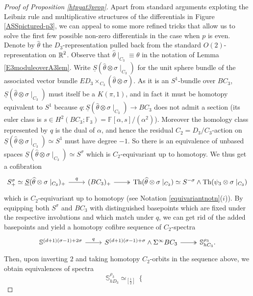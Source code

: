\documentclass[a4paper, oneside]{amsart}
\newcommand{\1}{\mathds{1}}
\theoremstyle{remark}
\theoremstyle{definition}
\newcommand{\R}{{\scaleobj{0.97}{\mathbb{R}}}}
\newcommand{\s}{\mathbb{S}}
\numberwithin{equation}{section}
\begin{document}
\begin{proof}[Proof of Proposition \ref{htpyat3prop}]
Apart from standard arguments exploting the Leibniz rule and multiplicative structures of the differentials in Figure \ref{ASSpictured-p3}, we can appeal to some more refined tricks that allow us to solve the first few possible non-zero differentials in the case when $p$ is even. Denote by $\widehat{\theta}$ the $D_3$-representation pulled back from the standard $O(2)$-representation on $\R^2$. Observe that $\widehat{\theta}\mid_{C_3}\equiv \theta$ in the notation of Lemma \ref{E3moduleoverA3lem}. Write $\underline{S}(\widehat{\theta}\otimes\sigma\mid_{C_3})$ for the unit sphere bundle of the associated vector bundle $ED_3\times_{C_3}(\widehat{\theta}\otimes\sigma)$. As it is an $S^1$-bundle over $BC_3$, $\underline{S}(\widehat\theta\otimes \sigma\mid_{C_3})$ must itself be a $K(\pi,1)$, and in fact it must be homotopy equivalent to $S^1$ because $q: \underline{S}(\widehat\theta\otimes \sigma\mid_{C_3})\to BC_3$ does not admit a section (its euler class is $s\in H^2(BC_3;\mathbb{F}_3)=\mathbb{F}[\alpha,s]/(\alpha^2)$). Moreover the homology class represented by $q$ is the dual of $\alpha$, and hence the residual $C_2=D_3/C_3$-action on $\underline{S}(\widehat\theta\otimes \sigma\mid_{C_3})\simeq S^1$ must have degree $-1$. So there is an equivalence of unbased spaces $\underline S(\widehat\theta\otimes\sigma\mid_{C_3})\simeq S^\sigma$ which is $C_2$-equivariant up to homotopy. We thus get a cofibration
$$
\begin{tikzcd}
S^\sigma_+\simeq \underline{S}(\widehat{\theta}\otimes\sigma\mid_{C_3})_+\rar["q"] &(BC_3)_+\rar[two heads] & \mathrm{Th}(\widehat\theta\otimes\sigma\mid_{C_3})\simeq S^{-\sigma}\wedge \mathrm{Th}(\psi_3\otimes\sigma\mid_{C_3})
\end{tikzcd}
$$
which is $C_2$-equivariant up to homotopy (see Notation \ref{equivariantnotn}($i$)). By equipping both $S^\sigma$ and $BC_3$ with distinguished basepoints which are fixed under the respective involutions and which match under $q$, we can get rid of the added basepoints and yield a homotopy cofibre sequence of $C_2$-spectra
$$
\begin{tikzcd}
\s^{(d+1)(\sigma-1)+2\sigma}\rar["q"] &S^{(d+1)(\sigma-1)+\sigma}\wedge\Sigma^{\infty}BC_3\rar[two heads] & \s^{\rho_3}_{hC_3}.
\end{tikzcd}
$$
Then, upon inverting $2$ and taking homotopy $C_2$-orbits in the sequence above, we obtain equivalences of spectra
\begin{equation}\label{C2cofibreE3spectrum}
    \s^{\rho_3}_{hD_3}\simeq_{[\frac{1}{2}]}\left\{\begin{array}{cl}

\end{array}
\end{equation}
\end{proof}
\end{document}
